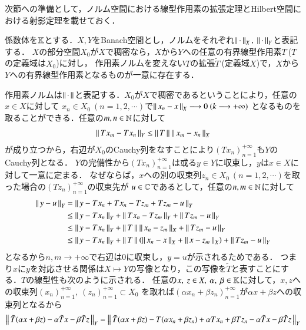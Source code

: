 \begin{qst}
次節への準備として，ノルム空間における線型作用素の拡張定理とHilbert空間における射影定理を載せておく．
\begin{thm}[線型作用素の拡張]
	係数体を$\mathbb{K}$とする．$X,Y$をBanach空間とし，ノルムをそれぞれ$\Norm{\cdot}{X},\ \Norm{\cdot}{Y}$と表記する．
	$X$の部分空間$X_0$が$X$で稠密なら，$X$から$Y$への任意の有界線型作用素$T\ $($T$の定義域は$X_0$)に対し，
	作用素ノルムを変えない$T$の拡張$\tilde{T}\ $(定義域$X$)で，$X$から$Y$への有界線型作用素となるものが一意に存在する．
\end{thm}
\begin{prf}
		作用素ノルムは$\left\|\, \cdot\, \right\|_{}$と表記する．$X_0$が$X$で稠密であるということにより，任意の$x \in X$に対して
		$x_n \in X_0 \ (n=1,2,\cdots)$で$\left\|\, x_n - x\, \right\|_{X} \longrightarrow 0\ (k \longrightarrow +\infty)$
		となるものを取ることができる．任意の$m,n \in \mathbb{N}$に対して
		\begin{align}
			\left\|\, Tx_m - Tx_n\, \right\|_{Y} \leq \left\|\, T\, \right\|_{} \left\|\, x_m - x_n\, \right\|_{X}
		\end{align}
		が成り立つから，右辺が$X_0$のCauchy列をなすことにより$(Tx_n)_{n=1}^{+\infty}$も$Y$のCauchy列となる．
		$Y$の完備性から$(Tx_n)_{n=1}^{+\infty}$は或る$y \in Y$に収束し，$y$は$x \in X$に対して一意に定まる．
		なぜならば，$x$への別の収束列$z_n \in X_0 \ (n=1,2,\cdots)$を取った場合の$(Tz_n)_{n=1}^{+\infty}$の収束先が
		$u \in \mathbb{C}$であるとして，任意の$n,m \in \mathbb{N}$に対して
		\begin{align}
			\left\|\, y - u\, \right\|_{Y} &= \left\|\, y - Tx_n + Tx_n - Tz_m + Tz_m - u\, \right\|_{Y} \\
			&\leq \left\|\, y - Tx_n\, \right\|_{Y} + \left\|\, Tx_n - Tz_m\, \right\|_{Y} + \left\|\, Tz_m - u\, \right\|_{Y} \\
			&\leq \left\|\, y - Tx_n\, \right\|_{Y} + \left\|\, T\, \right\|_{}\left\|\, x_n - z_m\, \right\|_{X} + \left\|\, Tz_m - u\, \right\|_{Y} \\
			&\leq \left\|\, y - Tx_n\, \right\|_{Y} + \left\|\, T\, \right\|_{}\left(\left\|\, x_n - x\, \right\|_{X} + \left\|\, x - z_m\, \right\|_{X}\right)+ \left\|\, Tz_m - u\, \right\|_{Y}
		\end{align}
		となるから$n,m \longrightarrow +\infty$で右辺は0に収束し，$y = u$が示されるためである．
		つまり$x$に$y$を対応させる関係は$X \longmapsto Y$の写像となり，この写像を$\tilde{T}$と表すことにする．$T$の線型性も次のように示される．
		任意の$x,\ z \in X,\ \alpha,\ \beta \in \mathbb{K}$に対して，$x,z$への収束列$(x_n)_{n=1}^{+\infty},\ (z_n)_{n=1}^{+\infty} \subset X_0$
		を取れば$(\alpha x_n + \beta z_n)_{n=1}^{+\infty}$が$\alpha x+ \beta z$への収束列となるから
		\begin{align}
			\Norm{\tilde{T}(\alpha x + \beta z) - \alpha \tilde{T}x - \beta \tilde{T}z}{Y}
			&= \Norm{\tilde{T}(\alpha x + \beta z) - T(\alpha x_n + \beta z_n) + \alpha Tx_n + \beta Tz_n - \alpha \tilde{T}x - \beta \tilde{T}z}{Y} \\

\end{align}
\end{prf}
\end{qst}
